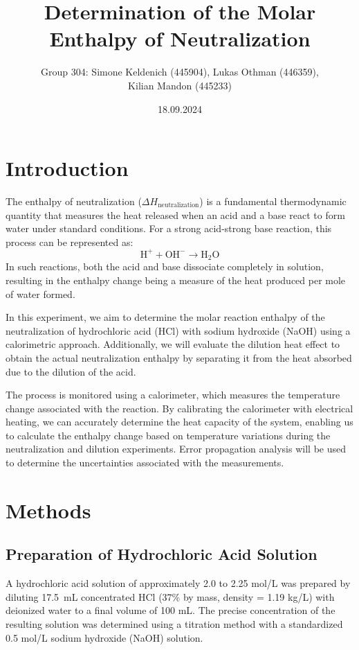 \documentclass[a4paper,12pt]{article}
\title{Determination of the Molar Enthalpy of Neutralization}
\author{Group 304: Simone Keldenich (445904), Lukas Othman (446359), \\Kilian Mandon (445233)}
\date{18.09.2024}
\begin{document}
\maketitle
\newpage

\section{Introduction}
The enthalpy of neutralization (\(\Delta H_{\text{neutralization}}\)) is a fundamental thermodynamic quantity that measures the heat released when an acid and a base react to form water under standard conditions. For a strong acid-strong base reaction, this process can be represented as:
\begin{equation}
\text{H}^+ + \text{OH}^- \rightarrow \text{H}_2\text{O}
\end{equation}
In such reactions, both the acid and base dissociate completely in solution, resulting in the enthalpy change being a measure of the heat produced per mole of water formed. 

In this experiment, we aim to determine the molar reaction enthalpy of the neutralization of hydrochloric acid (HCl) with sodium hydroxide (NaOH) using a calorimetric approach. Additionally, we will evaluate the dilution heat effect to obtain the actual neutralization enthalpy by separating it from the heat absorbed due to the dilution of the acid.

The process is monitored using a calorimeter, which measures the temperature change associated with the reaction. By calibrating the calorimeter with electrical heating, we can accurately determine the heat capacity of the system, enabling us to calculate the enthalpy change based on temperature variations during the neutralization and dilution experiments. Error propagation analysis will be used to determine the uncertainties associated with the measurements.

\section{Methods}
\subsection{Preparation of Hydrochloric Acid Solution}
A hydrochloric acid solution of approximately 2.0 to 2.25 mol/L was prepared by diluting 17.5~mL concentrated HCl (37\% by mass, density = 1.19 kg/L) with deionized water to a final volume of 100 mL. The precise concentration of the resulting solution was determined using a titration method with a standardized 0.5 mol/L sodium hydroxide (NaOH) solution. 
\end{document}
